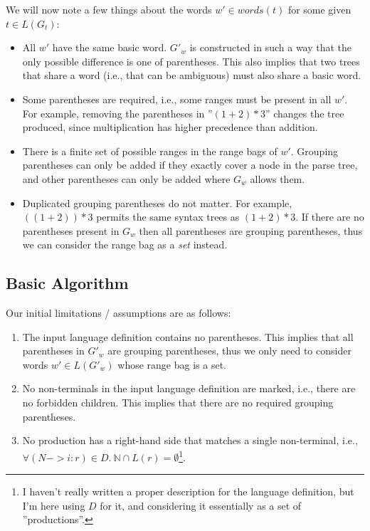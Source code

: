 \documentclass[acmsmall,review,anonymous]{acmart}\settopmatter{printfolios=true,printccs=false,printacmref=false}
\newcommand{\NT}{\mathbb{N}} %
\newcommand{\words}{\mathit{words}} %
\begin{document}
We will now note a few things about the words $w' \in \words(t)$ for some given $t \in L(G_t)$:

\begin{itemize}
\item All $w'$ have the same basic word. $G'_w$ is constructed in such a way that the only possible difference is one of parentheses. This also implies that two trees that share a word (i.e., that can be ambiguous) must also share a basic word.
\item Some parentheses are required, i.e., some ranges must be present in all $w'$. For example, removing the parentheses in ''$(1 + 2) * 3$'' changes the tree produced, since multiplication has higher precedence than addition.
\item There is a finite set of possible ranges in the range bags of $w'$. Grouping parentheses can only be added if they exactly cover a node in the parse tree, and other parentheses can only be added where $G_w$ allows them.
\item Duplicated grouping parentheses do not matter. For example, $((1 + 2)) * 3$ permits the same syntax trees as $(1 + 2) * 3$. If there are no parentheses present in $G_w$ then all parentheses are grouping parentheses, thus we can consider the range bag as a \emph{set} instead.
\end{itemize}

\subsection{Basic Algorithm}

Our initial limitations / assumptions are as follows:

\begin{enumerate}
  \item The input language definition contains no parentheses. This implies that all parentheses in $G'_w$ are grouping parentheses, thus we only need to consider words $w' \in L(G'_w)$ whose range bag is a set.

  \item No non-terminals in the input language definition are marked, i.e., there are no forbidden children. This implies that there are no required grouping parentheses.

  \item No production has a right-hand side that matches a single non-terminal, i.e., $\forall (N->i:r) \in D.\ \NT \cap L(r) = \emptyset$\footnote{I haven't really written a proper description for the language definition, but I'm here using $D$ for it, and considering it essentially as a set of ''productions''.}.
\end{enumerate}
\end{document}
